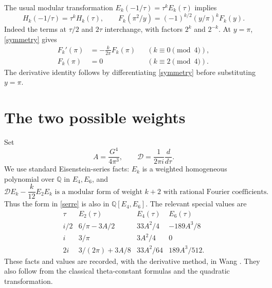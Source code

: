 \documentclass[11pt]{article}
\newcommand{\Q}{\mathbb Q}
\newcommand{\D}{\mathcal D}
\begin{document}
The usual modular transformation $E_k(-1/\tau)=\tau^kE_k(\tau)$
implies
\begin{equation}
 H_k(-1/\tau)=\tau^kH_k(\tau),\qquad
 F_k(\pi^2/y)=(-1)^{k/2}(y/\pi)^kF_k(y).          \label{symmetry}
\end{equation}
Indeed the terms at $\tau/2$ and $2\tau$ interchange, with factors
$2^k$ and $2^{-k}$. At $y=\pi$, \eqref{symmetry} gives
\begin{align}
 F_k'(\pi)&=-\frac{k}{2\pi}F_k(\pi)
                       &&(k\equiv0\pmod4),       \label{even}\\
 F_k(\pi)&=0            &&(k\equiv2\pmod4).       \label{odd}
\end{align}
The derivative identity follows by differentiating
\eqref{symmetry} before substituting $y=\pi$.

\section*{The two possible weights}
Set
\[
 A=\frac{G^4}{4\pi^3},\qquad
 \D=\frac{1}{2\pi i}\frac{d}{d\tau}.
\]
We use standard Eisenstein-series facts: $E_k$ is a weighted
homogeneous polynomial over $\Q$ in $E_4,E_6$, and
\begin{equation}
 \D E_k-\frac{k}{12}E_2E_k
 \text{ is a modular form of weight }k+2
 \text{ with rational Fourier coefficients}.       \label{serre}
\end{equation}
Thus the form in \eqref{serre} is also in $\Q[E_4,E_6]$.
The relevant special values are
\begin{equation}\label{cm}
\begin{array}{c|ccc}
 \tau&E_2(\tau)&E_4(\tau)&E_6(\tau)\\ \hline
 i/2&6/\pi-3A/2&33A^2/4&-189A^3/8\\
 i&3/\pi&3A^2/4&0\\
 2i&3/(2\pi)+3A/8&33A^2/64&189A^3/512 .
\end{array}
\end{equation}
These facts and values are recorded, with the derivative method,
in Wang \cite[Sections 2 and 4]{Wang}. They also follow from the
classical theta-constant formulas and the quadratic transformation.
\end{document}
